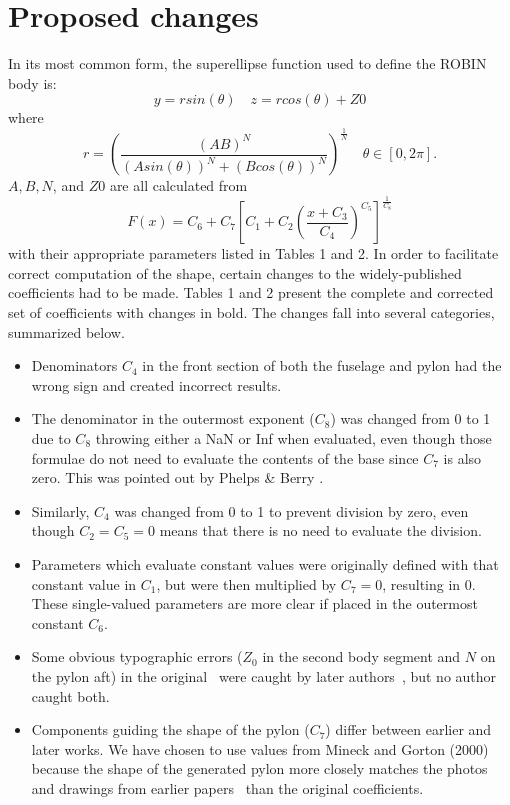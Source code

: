 \documentclass{ahs}
\begin{document}
\section{Proposed changes}
 In its most common form, the superellipse function used to define the ROBIN body is:
\begin{equation}
   y=rsin(\theta) \quad z=rcos(\theta)+Z0
\end{equation} 
where \begin{equation}
  r=\left(\frac{(AB)^{N}}{\left(Asin(\theta)\right)^{N}+\left(Bcos(\theta)\right)^{N}}\right)^{\frac{1}{N}} \quad \theta\in[0,2\pi].
\end{equation}
$A,B,N$, and $Z0$ are all calculated from
\begin{equation}
  F(x) = C_{6}+C_{7}\left[C_{1}+C_{2}\left(\frac{x+C_{3}}{C_{4}}\right)^{C_{5}}\right]^{\frac{1}{C_{8}}}
\end{equation}
with their appropriate parameters listed in Tables 1 and 2. In order to facilitate correct computation of the shape, certain changes to the
widely-published coefficients had to be made.
Tables 1 and 2 present the complete and corrected set of coefficients with changes in bold.
The changes fall into several categories, summarized below.
\begin{itemize}
\item Denominators $C_{4}$ in the front section of both the fuselage and pylon had the wrong sign
and created incorrect results.
\item The denominator in the outermost exponent ($C_{8}$) was changed from 0 to 1 due to $C_{8}$ throwing either a NaN or Inf when evaluated, even though those formulae do not need to evaluate the contents of the base since $C_{7}$ is also zero. This was pointed out by Phelps \& Berry \cite{nasa87762}.
\item Similarly, $C_{4}$ was changed from 0 to 1 to prevent division by zero, even though
$C_{2}=C_{5}=0$ means that there is no need to evaluate the division.
\item Parameters which evaluate constant values were originally defined with that constant value in $C_{1}$, but were then multiplied by $C_{7}=0$, resulting in $0$.
These single-valued parameters are more clear if placed in the outermost constant $C_{6}$.
\item Some obvious typographic errors ($Z_0$ in the second body segment and $N$ on the pylon aft)
in the original~ were caught by later authors~, but no author caught both.
\item Components guiding the shape of the pylon ($C_{7}$) differ between earlier and later works.
We have chosen to use values from Mineck and Gorton (2000)~ because the shape of the generated 
pylon more closely matches the photos and drawings from earlier papers~ than the original coefficients.
\end{itemize}
\end{document}
